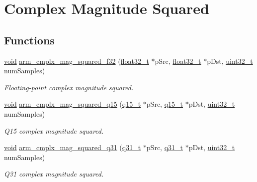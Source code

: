 \hypertarget{group__cmplx__mag__squared}{\section{Complex Magnitude Squared}
\label{group__cmplx__mag__squared}
}
\subsection*{Functions}
\begin{DoxyCompactItemize}
\item 
\hyperlink{group___n_a_m_e_ga18028b8badbf1ea7e704ccac3c488e82}{void} \hyperlink{group__cmplx__mag__squared_gaa7faccc0d96b061d8b7d0d7d82045074}{arm\-\_\-cmplx\-\_\-mag\-\_\-squared\-\_\-f32} (\hyperlink{arm__math_8h_a4611b605e45ab401f02cab15c5e38715}{float32\-\_\-t} $\ast$p\-Src, \hyperlink{arm__math_8h_a4611b605e45ab401f02cab15c5e38715}{float32\-\_\-t} $\ast$p\-Dst, \hyperlink{stdint_8h_a435d1572bf3f880d55459d9805097f62}{uint32\-\_\-t} num\-Samples)
\begin{DoxyCompactList}\small\item\em Floating-\/point complex magnitude squared. \end{DoxyCompactList}\item 
\hyperlink{group___n_a_m_e_ga18028b8badbf1ea7e704ccac3c488e82}{void} \hyperlink{group__cmplx__mag__squared_ga45537f576102d960d467eb722b8431f2}{arm\-\_\-cmplx\-\_\-mag\-\_\-squared\-\_\-q15} (\hyperlink{arm__math_8h_ab5a8fb21a5b3b983d5f54f31614052ea}{q15\-\_\-t} $\ast$p\-Src, \hyperlink{arm__math_8h_ab5a8fb21a5b3b983d5f54f31614052ea}{q15\-\_\-t} $\ast$p\-Dst, \hyperlink{stdint_8h_a435d1572bf3f880d55459d9805097f62}{uint32\-\_\-t} num\-Samples)
\begin{DoxyCompactList}\small\item\em Q15 complex magnitude squared. \end{DoxyCompactList}\item 
\hyperlink{group___n_a_m_e_ga18028b8badbf1ea7e704ccac3c488e82}{void} \hyperlink{group__cmplx__mag__squared_ga384b0538101e8c03fa4fa14271e63b04}{arm\-\_\-cmplx\-\_\-mag\-\_\-squared\-\_\-q31} (\hyperlink{arm__math_8h_adc89a3547f5324b7b3b95adec3806bc0}{q31\-\_\-t} $\ast$p\-Src, \hyperlink{arm__math_8h_adc89a3547f5324b7b3b95adec3806bc0}{q31\-\_\-t} $\ast$p\-Dst, \hyperlink{stdint_8h_a435d1572bf3f880d55459d9805097f62}{uint32\-\_\-t} num\-Samples)
\begin{DoxyCompactList}\small\item\em Q31 complex magnitude squared. \end{DoxyCompactList}\end{DoxyCompactItemize}


